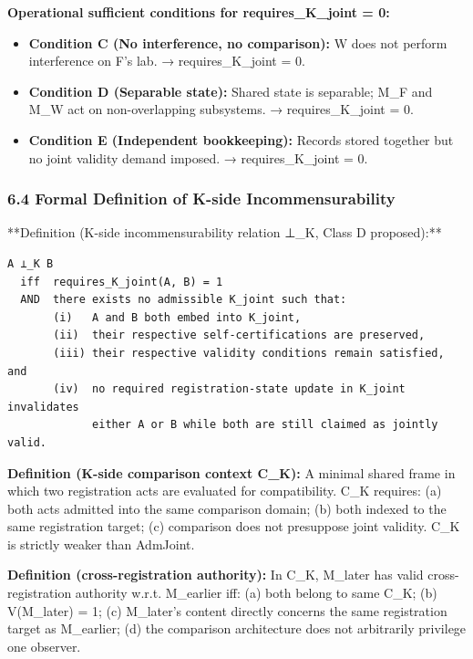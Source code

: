 \documentclass[
  11pt,
]{article}
\providecommand{\tightlist}{%
  \setlength{\itemsep}{0pt}\setlength{\parskip}{0pt}}
\begin{document}
\textbf{Operational sufficient conditions for requires\_K\_joint = 0:}

\begin{itemize}
\tightlist
\item
  \textbf{Condition C (No interference, no comparison):} W does not
  perform interference on F's lab. → requires\_K\_joint = 0.
\item
  \textbf{Condition D (Separable state):} Shared state is separable;
  M\_F and M\_W act on non-overlapping subsystems. → requires\_K\_joint
  = 0.
\item
  \textbf{Condition E (Independent bookkeeping):} Records stored
  together but no joint validity demand imposed. → requires\_K\_joint =
  0.
\end{itemize}

\subsubsection{6.4 Formal Definition of K-side
Incommensurability}\label{formal-definition-of-k-side-incommensurability}

**Definition (K-side incommensurability relation ⊥\_K, Class D
proposed):**

\begin{verbatim}
A ⊥_K B
  iff  requires_K_joint(A, B) = 1
  AND  there exists no admissible K_joint such that:
       (i)   A and B both embed into K_joint,
       (ii)  their respective self-certifications are preserved,
       (iii) their respective validity conditions remain satisfied, and
       (iv)  no required registration-state update in K_joint invalidates
             either A or B while both are still claimed as jointly valid.
\end{verbatim}

\textbf{Definition (K-side comparison context C\_K):} A minimal shared
frame in which two registration acts are evaluated for compatibility.
C\_K requires: (a) both acts admitted into the same comparison domain;
(b) both indexed to the same registration target; (c) comparison does
not presuppose joint validity. C\_K is strictly weaker than AdmJoint.

\textbf{Definition (cross-registration authority):} In C\_K, M\_later
has valid cross-registration authority w.r.t. M\_earlier iff: (a) both
belong to same C\_K; (b) V(M\_later) = 1; (c) M\_later's content
directly concerns the same registration target as M\_earlier; (d) the
comparison architecture does not arbitrarily privilege one observer.
\end{document}
